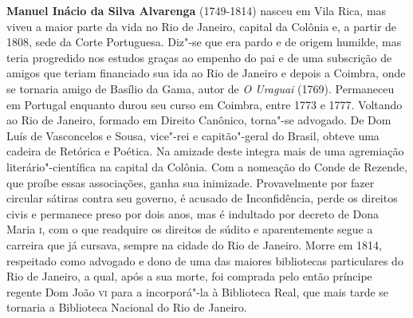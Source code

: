 \textbf{Manuel Inácio da Silva Alvarenga} (1749-1814) nasceu em Vila Rica,
mas viveu a maior parte da vida no Rio de Janeiro, capital da Colônia
e, a partir de 1808, sede da Corte Portuguesa.
Diz"-se que era pardo e de origem humilde, mas teria progredido
nos estudos graças ao empenho do pai e de uma subscrição de amigos
que teriam financiado sua ida ao Rio de Janeiro e depois a Coimbra,
onde se tornaria amigo de Basílio da Gama, autor de \textit{O Uraguai} (1769).
Permaneceu em Portugal enquanto durou seu curso em Coimbra,
entre 1773 e 1777. Voltando ao Rio de Janeiro, formado em Direito
Canônico, torna"-se advogado. 
De Dom Luís de Vasconcelos e Sousa, vice"-rei e capitão"-geral do Brasil,
obteve uma cadeira de Retórica e Poética. Na amizade deste integra mais
de uma agremiação literário"-científica na capital da Colônia. Com a
nomeação do Conde de Rezende, que proíbe essas associações,
ganha sua inimizade. Provavelmente por fazer circular sátiras contra seu
governo, é acusado de Inconfidência, perde os direitos civis e permanece
preso por dois anos, mas é indultado por decreto de Dona Maria \textsc{i}, com o
que readquire os direitos de súdito e aparentemente segue a carreira
que já cursava, sempre na cidade do Rio de Janeiro. Morre em 1814,
respeitado como advogado e dono de uma das maiores bibliotecas particulares
do Rio de Janeiro, a qual, após a sua morte, foi comprada pelo então príncipe
regente Dom João \textsc{vi} para a incorporá"-la à Biblioteca Real, que mais tarde
se tornaria a Biblioteca Nacional do Rio de Janeiro.

